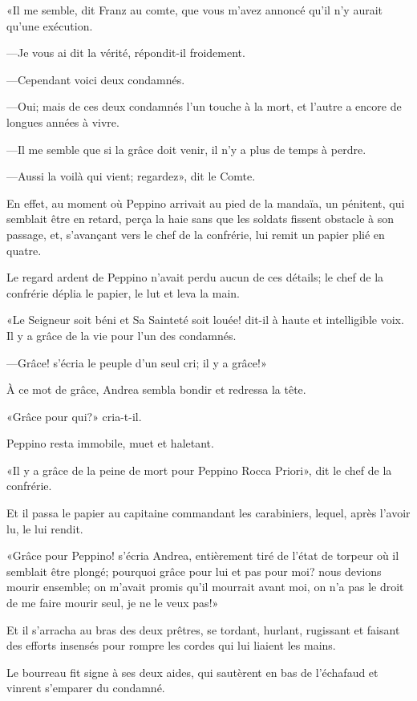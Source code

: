 «Il me semble, dit Franz au comte, que vous m'avez annoncé qu'il n'y aurait qu'une exécution. 

—Je vous ai dit la vérité, répondit-il froidement. 

—Cependant voici deux condamnés. 

—Oui; mais de ces deux condamnés l'un touche à la mort, et l'autre a encore de longues années à vivre. 

—Il me semble que si la grâce doit venir, il n'y a plus de temps à perdre. 

—Aussi la voilà qui vient; regardez», dit le Comte. 

En effet, au moment où Peppino arrivait au pied de la mandaïa, un pénitent, qui semblait être en retard, perça la haie sans que les soldats fissent obstacle à son passage, et, s'avançant vers le chef de la confrérie, lui remit un papier plié en quatre. 

Le regard ardent de Peppino n'avait perdu aucun de ces détails; le chef de la confrérie déplia le papier, le lut et leva la main. 

«Le Seigneur soit béni et Sa Sainteté soit louée! dit-il à haute et intelligible voix. Il y a grâce de la vie pour l'un des condamnés. 

—Grâce! s'écria le peuple d'un seul cri; il y a grâce!»  

À ce mot de grâce, Andrea sembla bondir et redressa la tête. 

«Grâce pour qui?» cria-t-il. 

Peppino resta immobile, muet et haletant. 

«Il y a grâce de la peine de mort pour Peppino Rocca Priori», dit le chef de la confrérie. 

Et il passa le papier au capitaine commandant les carabiniers, lequel, après l'avoir lu, le lui rendit. 

«Grâce pour Peppino! s'écria Andrea, entièrement tiré de l'état de torpeur où il semblait être plongé; pourquoi grâce pour lui et pas pour moi? nous devions mourir ensemble; on m'avait promis qu'il mourrait avant moi, on n'a pas le droit de me faire mourir seul, je ne le veux pas!» 

Et il s'arracha au bras des deux prêtres, se tordant, hurlant, rugissant et faisant des efforts insensés pour rompre les cordes qui lui liaient les mains. 

Le bourreau fit signe à ses deux aides, qui sautèrent en bas de l'échafaud et vinrent s'emparer du condamné. 

